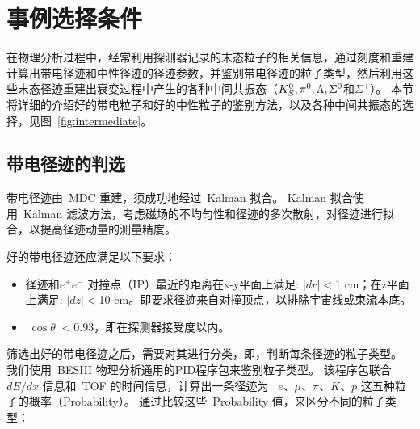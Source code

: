 \section{事例选择条件}
\label{sec:selection}
在物理分析过程中，经常利用探测器记录的末态粒子的相关信息，通过刻度和重建计算出带电径迹和中性径迹的径迹参数，并鉴别带电径迹的粒子类型，然后利用这些末态径迹重建出衰变过程中产生的各种中间共振态（$K_{S}^0,\pi^0,\Lambda,\Sigma^0$和$\Sigma^+$）。
本节将详细的介绍好的带电粒子和好的中性粒子的鉴别方法，以及各种中间共振态的选择，见图~\ref{fig:intermediate}。
\begin{figure*}[hp]
\centering
{}
\hspace{10pt}
\caption{数据中各中间共振态的不变质量谱的分布。}
\label{fig:intermediate}
\end{figure*}


\subsection{带电径迹的判选}

带电径迹由~MDC 重建，须成功地经过~Kalman 拟合。
Kalman 拟合使用~Kalman 滤波方法，考虑磁场的不均匀性和径迹的多次散射，对径迹进行拟合，以提高径迹动量的测量精度。

好的带电径迹还应满足以下要求：

\begin{itemize}
  \item 径迹和$e^{+}e^{-}$ 对撞点（IP）最近的距离在x-y平面上满足: $|dr|<$1 cm；在z平面上满足: $|dz|<$10 cm。即要求径迹来自对撞顶点，以排除宇宙线或束流本底。
  \item $|\cos\theta|<0.93$，即在探测器接受度以内。
\end{itemize}


筛选出好的带电径迹之后，需要对其进行分类，即，判断每条径迹的粒子类型。
我们使用~BESIII 物理分析通用的PID程序包来鉴别粒子类型。
该程序包联合~$dE/dx$ 信息和~TOF 的时间信息，计算出一条径迹为 ~$e$、$\mu$、$\pi$、$K$、$p$ 这五种粒子的概率（Probability）。
通过比较这些~Probability 值，来区分不同的粒子类型：

